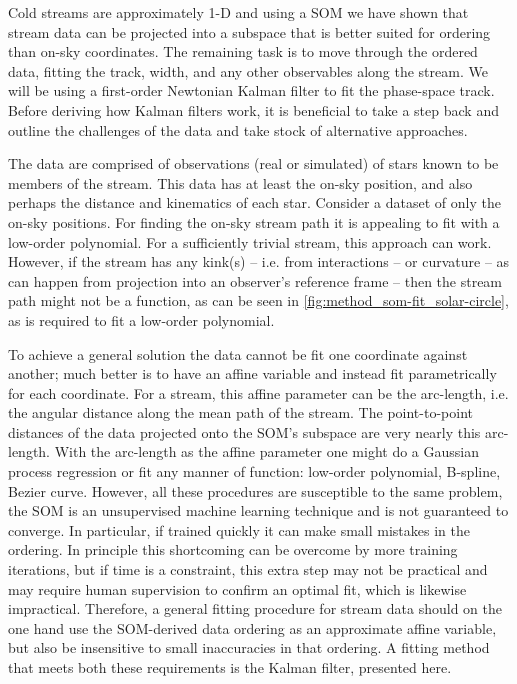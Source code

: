 \documentclass[fleqn,usenatbib]{mnras}
\begin{document}
  Cold streams are approximately 1-D and using a SOM we have shown that stream
  data can be projected into a subspace that is better suited for ordering than
  on-sky coordinates. The remaining task is to move through the ordered data,
  fitting the track, width, and any other observables along the stream. We will
  be using a first-order Newtonian Kalman filter to fit the phase-space track.
  Before deriving how Kalman filters work, it is beneficial to take a step back
  and outline the challenges of the data and take stock of alternative
  approaches.


    The data are comprised of observations (real or simulated) of stars known to
    be members of the stream. This data has at least the on-sky position, and
    also perhaps the distance and kinematics of each star. Consider a dataset of
    only the on-sky positions. For finding the on-sky stream path it is
    appealing to fit with a low-order polynomial. For a sufficiently trivial
    stream, this approach can work. However, if the stream has any kink(s) --
    i.e. from interactions -- or curvature -- as can happen from projection into
    an observer's reference frame -- then the stream path might not be a
    function, as can be seen in \autoref{fig:method_som-fit_solar-circle}, as is
    required to fit a low-order polynomial.    

    To achieve a general solution the data cannot be fit one coordinate against
    another; much better is to have an affine variable and instead fit
    parametrically for each coordinate. For a stream, this affine parameter can
    be the arc-length, i.e. the angular distance along the mean path of the
    stream. The point-to-point distances of the data projected onto the SOM's
    subspace are very nearly this arc-length. With the arc-length as the affine
    parameter one might do a Gaussian process regression \citep{Cervone2015} or
    fit any manner of function: low-order polynomial, B-spline, Bezier curve.
    However, all these procedures are susceptible to the same problem, the SOM
    is an unsupervised machine learning technique and is not guaranteed to
    converge. In particular, if trained quickly it can make small mistakes in
    the ordering. In principle this shortcoming can be overcome by more training
    iterations, but if time is a constraint, this extra step may not be
    practical and may require human supervision to confirm an optimal fit, which
    is likewise impractical. Therefore, a general fitting procedure for stream
    data should on the one hand use the SOM-derived data ordering as an
    approximate affine variable, but also be insensitive to small inaccuracies
    in that ordering. A fitting method that meets both these requirements is the
    Kalman filter, presented here.
\end{document}
